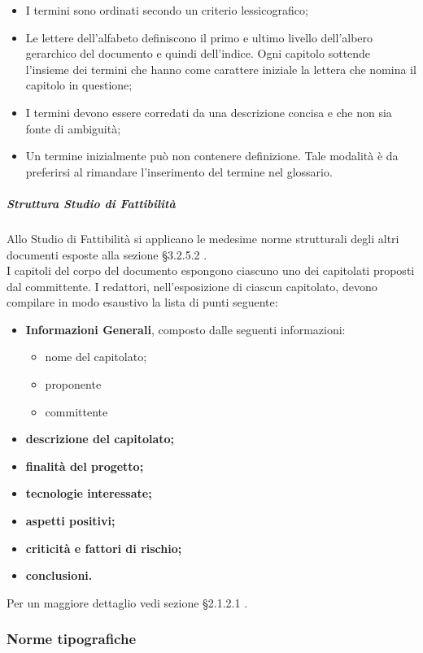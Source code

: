 					\begin{itemize}
						\item I  termini sono ordinati secondo un criterio lessicografico; 
						\item Le lettere dell'alfabeto definiscono il primo e ultimo livello dell’albero gerarchico del documento e quindi dell’indice. Ogni capitolo sottende l’insieme dei termini che hanno come carattere iniziale la lettera che nomina il capitolo in questione; 
						\item I termini devono essere corredati da una descrizione concisa e che non sia fonte di ambiguità; 
						\item Un termine inizialmente può non contenere definizione. Tale modalità è da preferirsi al rimandare l’inserimento del termine nel glossario.
					\end{itemize}
				\subparagraph{Struttura Studio di Fattibilità}
					Allo Studio di Fattibilità si applicano le medesime norme strutturali degli altri documenti esposte alla sezione §3.2.5.2 . \\
					I capitoli del corpo del documento espongono ciascuno uno dei capitolati proposti dal committente. I redattori, nell’esposizione di ciascun capitolato, devono compilare in modo esaustivo la lista di punti seguente: 
					\begin{itemize}
						\item\textbf{Informazioni Generali}, composto dalle seguenti informazioni:
							\begin{itemize}
								\item nome del capitolato;
								\item proponente
								\item committente
							\end{itemize}
						\item\textbf{descrizione del capitolato;}
						\item\textbf{finalità del progetto;}
						\item\textbf{tecnologie interessate;}
						\item\textbf{aspetti positivi;}
						\item\textbf{criticità e fattori di rischio;}
						\item\textbf{conclusioni.}
					\end{itemize}
					Per un maggiore dettaglio vedi sezione §2.1.2.1 .
		\subsubsection{Norme tipografiche}
